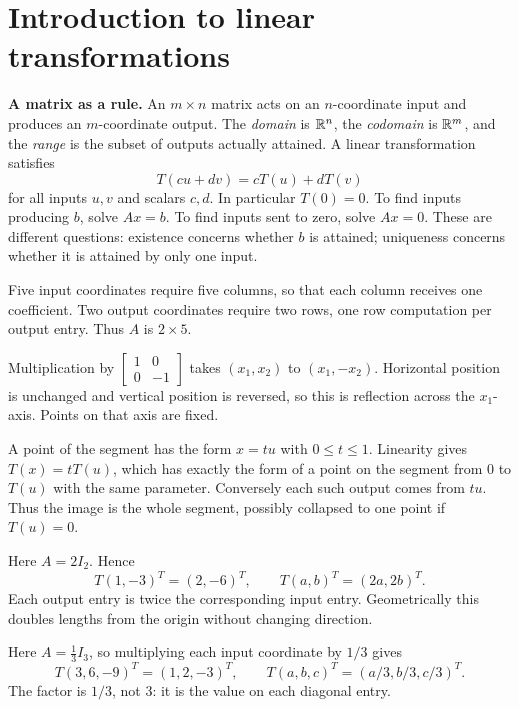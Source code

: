 \section{Introduction to linear transformations}
\textbf{A matrix as a rule.} An $m\times n$ matrix acts on an
$n$-coordinate input and produces an $m$-coordinate output. The
\emph{domain} is $\mathbb{R}^n$, the \emph{codomain} is $\mathbb{R}^m$, and the
\emph{range} is the subset of outputs actually attained. A linear
transformation satisfies
\[
 T(cu+dv)=cT(u)+dT(v)
\]
for all inputs $u,v$ and scalars $c,d$. In particular $T(0)=0$.
To find inputs producing $b$, solve $Ax=b$. To find inputs sent to
zero, solve $Ax=0$. These are different questions: existence concerns
whether $b$ is attained; uniqueness concerns whether it is attained
by only one input.

Five input coordinates require five columns, so that each column
receives one coefficient. Two output coordinates require two rows,
one row computation per output entry. Thus $A$ is $2\times5$.

Multiplication by $\begin{bmatrix}1&0\\0&-1\end{bmatrix}$ takes
$(x_1,x_2)$ to $(x_1,-x_2)$. Horizontal position is unchanged and
vertical position is reversed, so this is reflection across the $x_1$-axis.
Points on that axis are fixed.

A point of the segment has the form $x=tu$ with $0\le t\le1$.
Linearity gives $T(x)=tT(u)$, which has exactly the form of a
point on the segment from $0$ to $T(u)$ with the same parameter.
Conversely each such output comes from $tu$. Thus the image is the
whole segment, possibly collapsed to one point if $T(u)=0$.

Here $A=2I_2$. Hence
\[
 T(1,-3)^T=(2,-6)^T,\qquad T(a,b)^T=(2a,2b)^T.
\]
Each output entry is twice the corresponding input entry. Geometrically
this doubles lengths from the origin without changing direction.

Here $A=\tfrac13 I_3$, so multiplying each input coordinate by
$1/3$ gives
\[
 T(3,6,-9)^T=(1,2,-3)^T,\qquad
 T(a,b,c)^T=(a/3,b/3,c/3)^T.
\]
The factor is $1/3$, not $3$: it is the value on each diagonal entry.



